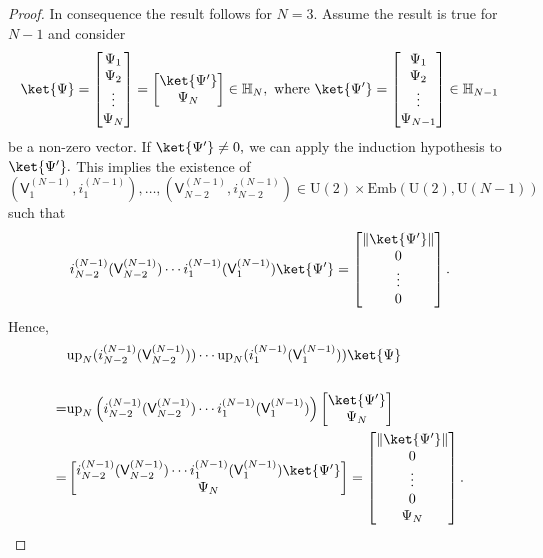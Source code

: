 \documentclass[a4paper,11pt]{article}
\newcommand{\rV}{\mathsf{V}}
\begin{document}
\begin{appendices}
\begin{proof}
      In consequence the result follows for $N=3.$ Assume the result is true for $N-1$ and consider 
      $$
      \ket{\Psi} = \begin{bmatrix} \Psi_1 \\ \Psi_2 \\ \vdots \\ \Psi_{N} \end{bmatrix} = \begin{bmatrix}\ket{\Psi^{\prime}}\\ \Psi_N \end{bmatrix} \in \mathbb{H}_N, \text{ where } \ket{\Psi'} = \begin{bmatrix} \Psi_1 \\ \Psi_2 \\ \vdots \\ \Psi_{N-1} \end{bmatrix} \in \mathbb{H}_{N-1}
      $$ 
      be a non-zero vector. If $\ket{\Psi^{\prime}} \neq 0,$ we can apply the induction hypothesis to $\ket{\Psi^{\prime}}.$ This implies the existence of $(\rV_1^{(N-1)},i_1^{(N-1)}),\ldots,(\rV_{N-2}^{(N-1)},i_{N-2}^{(N-1)}) \in\mathrm{U}(2) \times\mathrm{Emb}(\mathrm{U}(2),\mathrm{U}(N-1)) $ such that 
      $$
      i_{N-2}^{(N-1)}(\rV_{N-2}^{(N-1)}) \cdots i_1^{(N-1)}(\rV_1^{(N-1)}) \ket{\Psi^{\prime}} =  \begin{bmatrix} \|\ket{\Psi^{\prime}}\| \\ 0 \\ \vdots  \\ 0 \end{bmatrix}.
      $$
    Hence, 
    \begin{align*}
    & \mathrm{up}_N(i_{N-2}^{(N-1)}(\rV_{N-2}^{(N-1)})) \cdots  \mathrm{up}_N(i_1^{(N-1)}(\rV_1^{(N-1)})) \ket{\Psi} \\ 
    & \\
    = & \mathrm{up}_N\left(i_{N-2}^{(N-1)}(\rV_{N-2}^{(N-1)}) \cdots  i_1^{(N-1)}(\rV_1^{(N-1)})\right)  \begin{bmatrix}\ket{\Psi^{\prime}}\\ \Psi_N \end{bmatrix}
    \\ 
    = & \begin{bmatrix} i_{N-2}^{(N-1)}(\rV_{N-2}^{(N-1)}) \cdots i_1^{(N-1)}(\rV_1^{(N-1)}) \ket{\Psi^{\prime}} \\ \Psi_N \end{bmatrix} = \begin{bmatrix} \|\ket{\Psi^{\prime}}\| \\ 0 \\ \vdots  \\ 0 \\ \Psi_N \end{bmatrix}.

\end{align*}
\end{proof}
\end{appendices}
\end{document}
